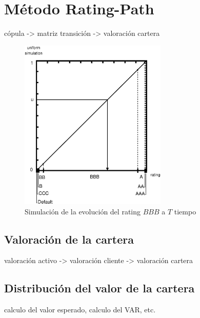 \section{M\'etodo Rating-Path}
c\'opula -> matriz transici\'on -> valoraci\'on cartera

\begin{figure}[!hb]
\begin{center}
\includegraphics[width=7cm,angle=0]{./images/simrp.eps}
\caption{Simulaci\'on de la evoluci\'on del rating $BBB$ a $T$ tiempo}
\label{simrp}
\end{center}
\end{figure}


\subsection{Valoraci\'on de la cartera}
valoraci\'on activo -> valoraci\'on cliente -> valoraci\'on cartera

\subsection{Distribuci\'on del valor de la cartera}
calculo del valor esperado, calculo del VAR, etc.

